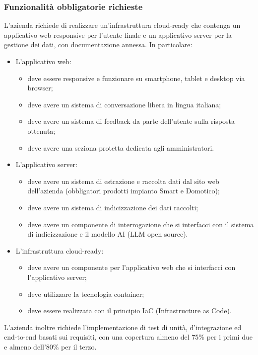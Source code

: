 \documentclass[10pt]{article}
\begin{document}
\subsubsection{Funzionalità obbligatorie richieste}
L’azienda richiede di realizzare un’infrastruttura cloud-ready che contenga un applicativo web responsive per l’utente finale e un applicativo server per la gestione dei dati, con documentazione annessa.
In particolare:

\begin{itemize} 
    \item L’applicativo web: 
    \begin{itemize}
        \item deve essere responsive e funzionare su smartphone, tablet e desktop via browser;
        \item deve avere un sistema di conversazione libera in lingua italiana;
        \item deve avere un sistema di feedback da parte dell’utente sulla risposta ottenuta;
        \item deve avere una seziona protetta dedicata agli amministratori.
    \end{itemize}
    \item L’applicativo server: 
    \begin{itemize}
        \item deve avere un sistema di estrazione e raccolta dati dal sito web dell’azienda (obbligatori prodotti impianto Smart e Domotico);
        \item deve avere un sistema di indicizzazione dei dati raccolti;
        \item deve avere un componente di interrogazione che si interfacci con il sistema di indicizzazione e il modello AI (LLM open source).
    \end{itemize}
    \item L’infrastruttura cloud-ready: 
    \begin{itemize}
        \item deve avere un componente per l’applicativo web che si interfacci con l’applicativo server;
        \item deve utilizzare la tecnologia container;
        \item deve essere realizzata con il principio IaC (Infrastructure as Code).
    \end{itemize}
\end{itemize}
L’azienda inoltre richiede l’implementazione di test di unità, d'integrazione ed end-to-end basati sui requisiti, con una copertura almeno del 75\% per i primi due e almeno dell’80\% per il terzo.
\end{document}

